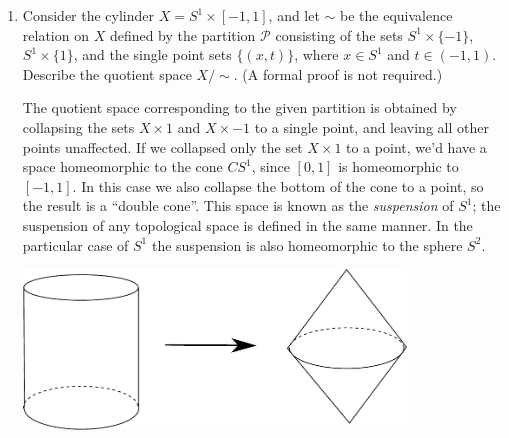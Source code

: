 \documentclass[12pt]{article}
\newcommand{\points}[1]{\marginpar{\hspace{24pt}[#1]}}
\begin{document}
\begin{enumerate}
\bigskip

 \item Consider the cylinder $X=S^1\times [-1,1]$, and let $\sim$ be the equivalence relation on $X$ defined by the partition  $\mathcal{P}$ consisting of the sets $S^1\times\{-1\}$, $S^1\times\{1\}$, and the single point sets $\{(x,t)\}$, where $x\in S^1$ and $t\in (-1,1)$. Describe the quotient space $X/\sim$. \points{4} (A formal proof is not required.)

\bigskip

The quotient space corresponding to the given partition is obtained by collapsing the sets $X\times {1}$ and $X\times {-1}$ to a single point, and leaving all other points unaffected. If we collapsed only the set $X\times {1}$ to a point, we'd have a space homeomorphic to the cone $CS^1$, since $[0,1]$ is homeomorphic to $[-1,1]$. In this case we also collapse the bottom of the cone to a point, so the result is a ``double cone''. This space is known as the {\em suspension} of $S^1$; the suspension of any topological space is defined in the same manner. In the particular case of $S^1$ the suspension is also homeomorphic to the sphere $S^2$.
\begin{center}
 \includegraphics[width=4in]{Q7.pdf}
\end{center}

\end{enumerate}
\end{document}
